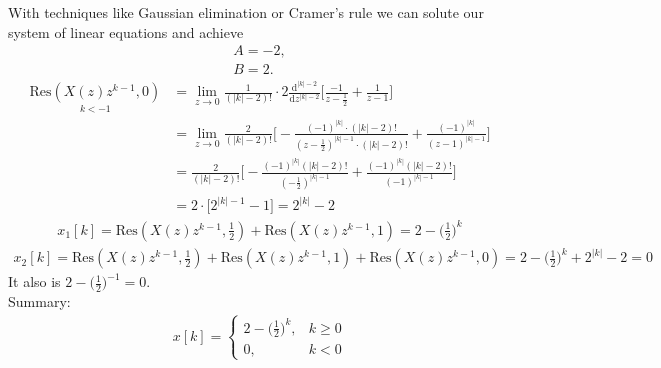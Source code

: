With techniques like Gaussian elimination or Cramer's rule we can solute our system of linear equations and achieve
\begin{align}
	A = -2, \nonumber \\
	B = 2.
\end{align}
\begin{align}
	\underset{k<-1}{\mathrm{Res}(X(z)z^{k-1},0)}&=\lim\limits_{z\rightarrow0}\frac{1}{(|k|-2)!}\cdot2\frac{\mathrm{d}^{|k|-2}}{\mathrm{d}z^{|k|-2}}\Bigg [\frac{-1}{z-\frac{1}{2}}+\frac{1}{z-1}\Bigg]\nonumber \\
	&=\lim\limits_{z\rightarrow0}\frac{2}{(|k|-2)!}\Bigg [-\frac{(-1)^{|k|}\cdot(|k|-2)!}{(z-\frac{1}{2})^{|k|-1}\cdot(|k|-2)!}+\frac{(-1)^{|k|}}{(z-1)^{|k|-1}}\Bigg] \nonumber \\
	&=\frac{2}{(|k|-2)!}\Bigg [-\frac{(-1)^{|k|}(|k|-2)!}{(-\frac{1}{2})^{|k|-1}}+\frac{(-1)^{|k|}(|k|-2)!}{(-1)^{|k|-1}}\Bigg] \nonumber \\
	&=2\cdot \Bigg [2^{|k|-1}-1\Bigg]=2^{|k|}-2
\end{align}
\begin{align}
	x_1[k]=\mathrm{Res}(X(z)z^{k-1},\frac{1}{2})+\mathrm{Res}(X(z)z^{k-1},1)=2-\bigg (\frac{1}{2}\bigg)^k
\end{align}
\begin{align}
	x_2[k]=\mathrm{Res}(X(z)z^{k-1},\frac{1}{2})+\mathrm{Res}(X(z)z^{k-1},1)+\mathrm{Res}(X(z)z^{k-1},0)=2-\bigg (\frac{1}{2})^k+2^{|k|}-2=0
\end{align}
It also is $2-\bigg (\frac{1}{2}\bigg)^{-1}=0$. \\
Summary:
\begin{align}
	x[k]=
	\begin{cases}
		2-\bigg (\frac{1}{2}\bigg)^k, &k\geq 0 \\
		0, &k< 0
	\end{cases}
\end{align}
